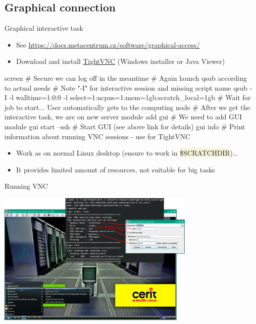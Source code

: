 \documentclass[compress, xelatex, 11pt, xcolor=svgnames, aspectratio=169,
	hyperref={
		bookmarks=true,
		unicode=true,
		colorlinks=true,
		pdftitle={Linux, command line and MetaCentrum},
		plainpages=false,
		pdfauthor={Vojtech Zeisek},
		pdfsubject={Course about use of Linux command line, writing shell scripts and using MetaCentrum of CESNET},
		pdfcreator={XeLaTeX},
		pdfkeywords={Linux, GNU, BASH, shell, command line, MetaCentrum},
		linkcolor=DarkRed, %
		anchorcolor=DarkBlue, %
		citecolor=Indigo, %
		filecolor=NavyBlue, %
		menucolor=DarkMagenta, %
		urlcolor=DarkBlue, %
		},
	url={hyphens, lowtilde} %
	]{beamer}
\renewcommand{\texttt}[1]{\colorbox{Beige}{{\ttfamily #1}}}
\begin{document}
\subsection{Graphical connection}

\begin{frame}[fragile]{Graphical interactive task}
	\begin{itemize}
		\item See \url{https://docs.metacentrum.cz/software/graphical-access/}
		\item Download and install \href{https://www.tightvnc.com/}{TightVNC} (Windows installer or Java Viewer)
	\end{itemize}
	\begin{bashcode}
    screen # Secure we can log off in the meantime
    # Again launch qsub according to actual needs
    # Note "-I" for interactive session and missing script name
    qsub -I -l walltime=1:0:0 -l select=1:ncpus=1:mem=1gb:scratch_local=1gb
    # Wait for job to start... User automatically gets to the computing node
    # After we get the interactive task, we are on new server
    module add gui # We need to add GUI module
    gui start --ssh # Start GUI (see above link for details)
    gui info # Print information about running VNC sessions - use for TightVNC
	\end{bashcode}
	\begin{itemize}
		\item Work as on normal Linux desktop (ensure to work in \texttt{\$SCRATCHDIR})\ldots
		\item It provides limited amount of resources, not suitable for big tasks
	\end{itemize}
\end{frame}

\begin{frame}{Running VNC}
	\begin{center}
		\includegraphics[height=6.5cm]{vnc.png}
	\end{center}
\end{frame}
\end{document}
